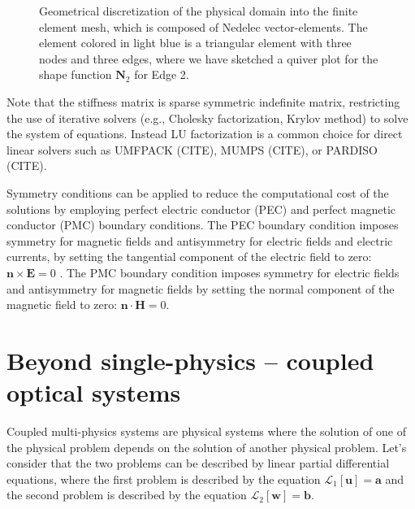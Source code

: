 \begin{figure}[tb]
    \centering
    \caption{Geometrical discretization of the physical domain into the finite element mesh, which is composed of Nedelec vector-elements. The element colored in light blue is a triangular element with three nodes and three edges, where we have sketched a quiver plot for the shape function $\mathbf{N}_2$ for Edge 2.}
    \label{fig:fem}
\end{figure}

Note that the stiffness matrix is sparse symmetric indefinite matrix, restricting the use of iterative solvers 
(e.g., Cholesky factorization, Krylov method) to solve the system of equations. Instead LU factorization is 
a common choice for direct linear solvers such as UMFPACK (CITE), MUMPS (CITE), or PARDISO (CITE).

Symmetry conditions can be applied to reduce the computational
cost of the solutions by employing perfect electric conductor (PEC) and perfect magnetic 
conductor (PMC) boundary conditions. The PEC boundary condition
imposes symmetry for magnetic fields and antisymmetry for electric fields and electric 
currents, by setting the tangential component of the electric field to zero: $\mathbf{n}\times \mathbf{E} = 0$ .
The PMC boundary condition imposes symmetry for electric fields and antisymmetry for magnetic fields
by setting the normal component of the magnetic field to zero: $\mathbf{n}\cdot \mathbf{H} = 0$.

\section{Beyond single-physics -- coupled optical systems}

Coupled multi-physics systems are physical systems where the solution of one of the physical 
problem depends on the solution of another physical problem. Let's consider that the two
problems can be described by linear partial differential equations, where the first problem
is described by the equation $\mathcal{L}_1 [\mathbf{u}]= \mathbf{a}$ and the second problem is described by the 
equation $\mathcal{L}_2 [\mathbf{w}]= \mathbf{b}$.

